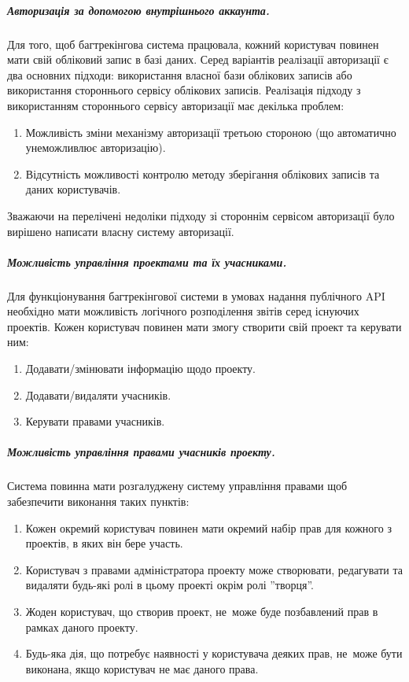\documentclass[../main.tex]{subfiles}
\begin{document}
\subparagraph{Авторизація за допомогою внутрішнього аккаунта.}
Для того, щоб багтрекінгова система працювала, кожний користувач повинен мати свій обліковий запис в базі даних. Серед варіантів реалізації авторизації є два основних підходи: використання власної бази облікових записів або використання стороннього сервісу облікових записів. Реалізація підходу з використанням стороннього сервісу авторизації має декілька проблем:
\begin{enumerate}
    \item Можливість зміни механізму авторизації третьою стороною (що автоматично унеможливлює авторизацію).
    \item Відсутність можливості контролю методу зберігання облікових записів та даних користувачів.
\end{enumerate}

Зважаючи на перелічені недоліки підходу зі стороннім сервісом авторизації було вирішено написати власну систему авторизації.

\subparagraph{Можливість управління проектами та їх учасниками.}
Для функціонування багтрекінгової системи в умовах надання публічного API необхідно мати можливість логічного розподілення звітів серед існуючих проектів. Кожен користувач повинен мати змогу створити свій проект та керувати ним:
\begin{enumerate}
    \item Додавати/змінювати інформацію щодо проекту.
    \item Додавати/видаляти учасників.
    \item Керувати правами учасників.
\end{enumerate}

\subparagraph{Можливість управління правами учасників проекту.}
Система повинна мати розгалуджену систему управління правами щоб забезпечити виконання таких пунктів:
\begin{enumerate}
    \item Кожен окремий користувач повинен мати окремий набір прав для кожного з проектів, в яких він бере участь.
    \item Користувач з правами адміністратора проекту може створювати, редагувати та видаляти будь-які ролі в цьому проекті окрім ролі ''творця''.
    \item Жоден користувач, що створив проект, не~може буде позбавлений прав в рамках даного проекту.
    \item Будь-яка дія, що потребує наявності у користувача деяких прав, не~може бути виконана, якщо користувач не має даного права.
\end{enumerate}
\end{document}
